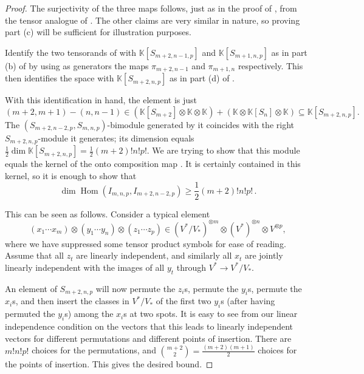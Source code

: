 \documentclass[11pt]{article}
\theoremstyle{plain}
\theoremstyle{nonumberplain}
\theoremstyle{plain}
\theoremstyle{nonumberplain}
\newtheorem{proof}{Proof}
\newcommand\bK{{\mathbb K}}
\DeclareMathOperator{\Hom}{\mathrm{Hom}}
\begin{document}
\begin{proof}
  The surjectivity of the three maps follows, just as in the proof of , from the tensor analogue of . The other claims are very similar in nature, so proving part (c) will be sufficient for illustration purposes. 

Identify the two tensorands of  with $\bK[S_{m+2,n-1,p}]$ and $\bK[S_{m+1,n,p}]$ as in part (b) of  by using as generators the maps $\pi_{m+2,n-1}$ and $\pi_{m+1,n}$ respectively. This then identifies the space  with $\bK[S_{m+2,n,p}]$ as in part (d) of . 

With this identification in hand, the element  is just
\begin{equation*}
  (m+2,m+1)-(n,n-1)\in (\bK[S_{m+2}]\otimes \bK\otimes \bK)+(\bK\otimes \bK[S_n]\otimes \bK)\subseteq \bK[S_{m+2,n,p}].
\end{equation*}
The $(S_{m+2,n-2,p},S_{m,n,p})$-bimodule generated by it coincides with the right $S_{m+2,n,p}$-module it generates; its dimension equals $\frac12\dim\bK\left[S_{m+2,n,p}\right]=\frac12(m+2)!n!p!$. We are trying to show that this module equals the kernel of the onto composition map . It is certainly contained in this kernel, so it is enough to show that 
\begin{equation*}
\dim\Hom(I_{m,n,p},I_{m+2,n-2,p}) \geq \frac 12 (m+2)!n!p!\,.
\end{equation*}

This can be seen as follows. Consider a typical element
\begin{equation}\label{eq.2_elt}
  (x_1\cdots x_m)\otimes (y_1\cdots y_n)\otimes (z_1\cdots z_p)\in (V^*/V_*)^{\otimes m}\otimes (V^*)^{\otimes n}\otimes V^{\otimes p},
\end{equation}
where we have suppressed some tensor product symbols for ease of reading. Assume that all $z_t$ are linearly independent, and similarly all $x_t$ are jointly linearly independent with the images of all $y_t$ through $V^*\to V^*/V_*$. 

An element of $S_{m+2,n,p}$ will now permute the $z_i$s, permute the $y_i$s, permute the $x_i$s, and then insert the classes in $V^*/V_*$ of the first two $y_i$s (after having permuted the $y_i$s) among the $x_i$s at two spots. It is easy to see from our linear independence condition on the vectors that this leads to linearly independent vectors for different permutations and different points of insertion. There are $m!n!p!$ choices for the permutations, and $\binom{m+2}{2}=\frac{(m+2)(m+1)}{2}$ choices for the points of insertion. This gives the desired bound. 
\end{proof}
\end{document}
